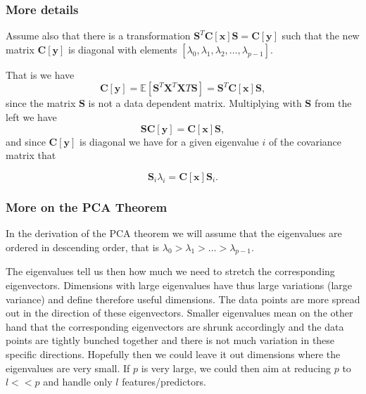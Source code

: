 \documentclass{beamer}
\begin{document}
\begin{frame}
\frametitle{More details}

Assume also that there is a transformation $\bm{S}^T\bm{C}[\bm{x}]\bm{S}=\bm{C}[\bm{y}]$ such that the new matrix $\bm{C}[\bm{y}]$ is diagonal with elements $[\lambda_0,\lambda_1,\lambda_2,\dots,\lambda_{p-1}]$.  

That is we have
\[
\bm{C}[\bm{y}] = \mathbb{E}[\bm{S}^T\bm{X}^T\bm{X}T\bm{S}]=\bm{S}^T\bm{C}[\bm{x}]\bm{S},
\]
since the matrix $\bm{S}$ is not a data dependent matrix.   Multiplying with $\bm{S}$ from the left we have
\[
\bm{S}\bm{C}[\bm{y}] = \bm{C}[\bm{x}]\bm{S},
\]
and since $\bm{C}[\bm{y}]$ is diagonal we have for a given eigenvalue $i$ of the covariance matrix that

\[
\bm{S}_i\lambda_i = \bm{C}[\bm{x}]\bm{S}_i.
\]
\end{frame}

\begin{frame}
\frametitle{More on the PCA Theorem}

In the derivation of the PCA theorem we will assume that the eigenvalues are ordered in descending order, that is
$\lambda_0 > \lambda_1 > \dots > \lambda_{p-1}$. 

The eigenvalues tell us then how much we need to stretch the
corresponding eigenvectors. Dimensions with large eigenvalues have
thus large variations (large variance) and define therefore useful
dimensions. The data points are more spread out in the direction of
these eigenvectors.  Smaller eigenvalues mean on the other hand that
the corresponding eigenvectors are shrunk accordingly and the data
points are tightly bunched together and there is not much variation in
these specific directions. Hopefully then we could leave it out
dimensions where the eigenvalues are very small. If $p$ is very large,
we could then aim at reducing $p$ to $l << p$ and handle only $l$
features/predictors.
\end{frame}
\end{document}
